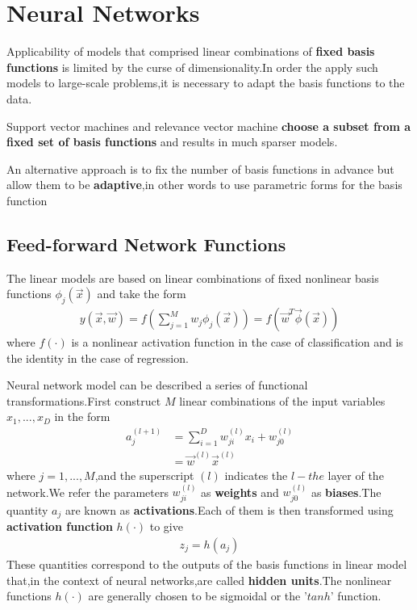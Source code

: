 \chapter{Neural Networks}
\label{chapter:neural networks}

Applicability of models that comprised linear combinations of \textbf{fixed basis functions} is limited by the curse of dimensionality.In order the apply such models to large-scale problems,it is necessary to adapt the basis functions to the data.

Support vector machines and relevance vector machine \textbf{choose a subset from a fixed set of basis functions} and results in much sparser models.

An alternative approach is to fix the number of basis functions in advance but allow them to be \textbf{adaptive},in other words to use parametric forms for the basis function 
\section{Feed-forward Network Functions}
The linear models are based on linear combinations of fixed nonlinear basis functions $\phi_j(\vec{x})$ and take the form
\begin{align}
    y(\vec{x},\vec{w}) = f(\sum_{j=1}^{M}w_j\phi_j(\vec{x})) = f(\vec{w}^T\vec{\phi}(\vec{x}))
\end{align}
where $f(\cdot)$ is a nonlinear activation function in the case of classification and is the identity in the case of regression.

Neural network model can be described a series of functional transformations.First construct $M$ linear combinations of the input variables $x_1,...,x_D$ in the form
\begin{align}
    a_j^{(l+1)} &= \sum_{i=1}^{D}w_{ji}^{(l)}x_i+w_{j0}^{(l)} \\
	    &= \vec{w}^{(l)}\vec{x}^{(l)}
\end{align}
where $j=1,...,M$,and the superscript $(l)$ indicates the $l-the$ layer of the network.We refer the parameters $w_{ji}^{(l)}$ as \textbf{weights} and $w_{j0}^{(l)}$ as \textbf{biases}.The quantity $a_j$ are known as \textbf{activations}.Each of them is then transformed using \textbf{activation function} $h(\cdot)$ to give
\begin{align}
    z_j=h(a_j)
\end{align}
These quantities correspond to the outputs of the basis functions in linear model that,in the context of neural networks,are called \textbf{hidden units}.The nonlinear functions $h(\cdot)$ are generally chosen to be sigmoidal or the '$tanh$' function.

